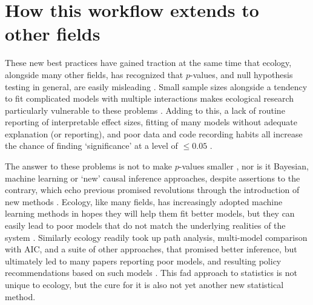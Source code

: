 \documentclass[11pt]{article}
\begin{document}
\section*{How this workflow extends to other fields} 

These new best practices have gained traction at the same time that ecology, alongside many other fields, has recognized that $p$-values, and null hypothesis testing in general, are easily misleading \citep{gelman2017statistical,ferraro2020feature,filazzola2021replication,fraser2020role}. Small sample sizes alongside a tendency to fit complicated models with multiple interactions makes ecological research particularly vulnerable to these problems \citep{gelman2015connection}. Adding to this, a lack of routine reporting of interpretable effect sizes, fitting of many models without adequate explanation (or reporting), and poor data and code recording habits all increase the chance of finding `significance' at a level of $\le0.05$ \citep{halsey2015,loken2017}. 

The answer to these problems is not to make $p$-values smaller \citep{halsey2015,colquhoun2017}, nor is it Bayesian, machine learning or `new' causal inference approaches, despite assertions to the contrary, which echo previous promised revolutions through the introduction of new methods \citep[e.g.,][]{mitchell1992testing,Burnham2004,byrnes2025causal}. 
Ecology, like many fields, has increasingly adopted machine learning methods in hopes they will help them fit better models, but they can easily lead to poor models that do not match the underlying realities of the system \citep{efron2020prediction,pichler2023machine}. Similarly ecology readily took up path analysis, multi-model comparison with AIC, and a suite of other approaches, that promised better inference, but ultimately led to many papers reporting poor models, and resulting policy recommendations based on such models \citep{petraitis1996inferring,leroux2019prevalence}. This fad approach to statistics is not unique to ecology, but the cure for it is also not yet another new statistical method.
\end{document}
